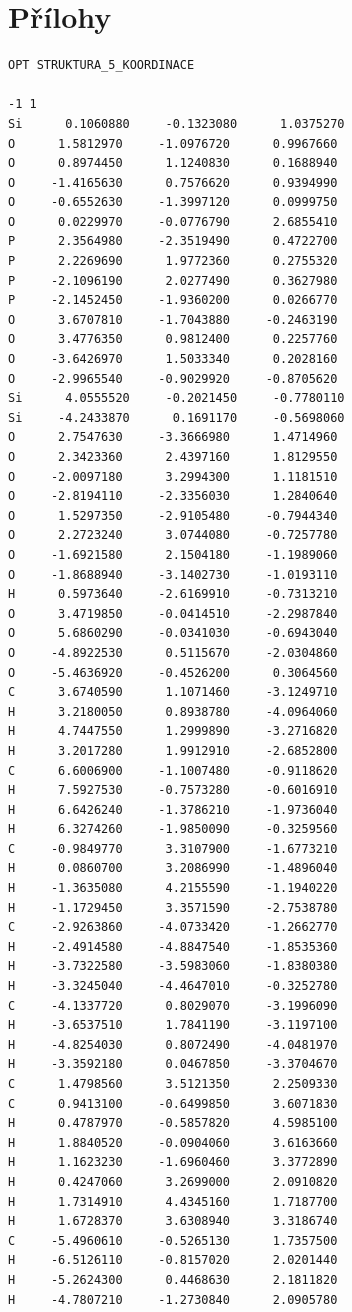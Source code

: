 \documentclass[
  digital, %
  table,   %
  lof,     %
  lot,     %
  oneside,
]{fithesis3}
\begin{document}
\chapter{Přílohy}
  \begin{lstlisting}[frame=single, caption={struktura koordinace 5},label=DescriptiveLabel]
OPT STRUKTURA_5_KOORDINACE

-1 1
Si      0.1060880     -0.1323080      1.0375270
O      1.5812970     -1.0976720      0.9967660
O      0.8974450      1.1240830      0.1688940
O     -1.4165630      0.7576620      0.9394990
O     -0.6552630     -1.3997120      0.0999750
O      0.0229970     -0.0776790      2.6855410
P      2.3564980     -2.3519490      0.4722700
P      2.2269690      1.9772360      0.2755320
P     -2.1096190      2.0277490      0.3627980
P     -2.1452450     -1.9360200      0.0266770
O      3.6707810     -1.7043880     -0.2463190
O      3.4776350      0.9812400      0.2257760
O     -3.6426970      1.5033340      0.2028160
O     -2.9965540     -0.9029920     -0.8705620
Si      4.0555520     -0.2021450     -0.7780110
Si     -4.2433870      0.1691170     -0.5698060
O      2.7547630     -3.3666980      1.4714960
O      2.3423360      2.4397160      1.8129550
O     -2.0097180      3.2994300      1.1181510
O     -2.8194110     -2.3356030      1.2840640
O      1.5297350     -2.9105480     -0.7944340
O      2.2723240      3.0744080     -0.7257780
O     -1.6921580      2.1504180     -1.1989060
O     -1.8688940     -3.1402730     -1.0193110
H      0.5973640     -2.6169910     -0.7313210
O      3.4719850     -0.0414510     -2.2987840
O      5.6860290     -0.0341030     -0.6943040
O     -4.8922530      0.5115670     -2.0304860
O     -5.4636920     -0.4526200      0.3064560
C      3.6740590      1.1071460     -3.1249710
H      3.2180050      0.8938780     -4.0964060
H      4.7447550      1.2999890     -3.2716820
H      3.2017280      1.9912910     -2.6852800
C      6.6006900     -1.1007480     -0.9118620
H      7.5927530     -0.7573280     -0.6016910
H      6.6426240     -1.3786210     -1.9736040
H      6.3274260     -1.9850090     -0.3259560
C     -0.9849770      3.3107900     -1.6773210
H      0.0860700      3.2086990     -1.4896040
H     -1.3635080      4.2155590     -1.1940220
H     -1.1729450      3.3571590     -2.7538780
C     -2.9263860     -4.0733420     -1.2662770
H     -2.4914580     -4.8847540     -1.8535360
H     -3.7322580     -3.5983060     -1.8380380
H     -3.3245040     -4.4647010     -0.3252780
C     -4.1337720      0.8029070     -3.1996090
H     -3.6537510      1.7841190     -3.1197100
H     -4.8254030      0.8072490     -4.0481970
H     -3.3592180      0.0467850     -3.3704670
C      1.4798560      3.5121350      2.2509330
C      0.9413100     -0.6499850      3.6071830
H      0.4787970     -0.5857820      4.5985100
H      1.8840520     -0.0904060      3.6163660
H      1.1623230     -1.6960460      3.3772890
H      0.4247060      3.2699000      2.0910820
H      1.7314910      4.4345160      1.7187700
H      1.6728370      3.6308940      3.3186740
C     -5.4960610     -0.5265130      1.7357500
H     -6.5126110     -0.8157020      2.0201440
H     -5.2624300      0.4468630      2.1811820
H     -4.7807210     -1.2730840      2.0905780

  \end{lstlisting}
\end{document}
